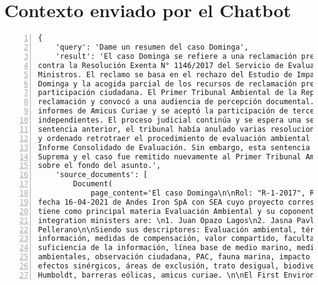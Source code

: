 \chapter{Contexto enviado por el Chatbot}\label{appx:contexto}

\begin{Verbatim}[frame=lines, label=Elavoración propia -  Ejemplo de Contexto enviado por el Chatbot a OpenAI
				, fontsize=\scriptsize, numbers=left
				, baselinestretch=0.4
				, formatcom=\color{gray}]
{
    'query': 'Dame un resumen del caso Dominga',
    'result': 'El caso Dominga se refiere a una reclamación presentada por Andes Iron SpA
contra la Resolución Exenta N° 1146/2017 del Servicio de Evaluación Ambiental y el Comité de
Ministros. El reclamo se basa en el rechazo del Estudio de Impacto Ambiental del proyecto
Dominga y la acogida parcial de los recursos de reclamación presentados en el marco de la
participación ciudadana. El Primer Tribunal Ambiental de la República de Chile admitió la
reclamación y convocó a una audiencia de percepción documental. Además, se presentaron
informes de Amicus Curiae y se aceptó la participación de terceros coadyuvantes e
independientes. El proceso judicial continúa y se espera una sentencia definitiva. En una
sentencia anterior, el tribunal había anulado varias resoluciones relacionadas con el proyecto
y ordenado retrotraer el procedimiento de evaluación ambiental a una etapa posterior al
Informe Consolidado de Evaluación. Sin embargo, esta sentencia fue anulada por la Corte
Suprema y el caso fue remitido nuevamente al Primer Tribunal Ambiental para que se pronuncie
sobre el fondo del asunto.',
    'source_documents': [
        Document(
            page_content='El caso Dominga\n\nRol: "R-1-2017", Rol: "R-1-2017",Rol: "R-1-2017",
fecha 16-04-2021 de Andes Iron SpA con SEA cuyo proyecto corresponde a Dominga. Este caso
tiene como principal materia Evaluación Ambiental y su coponente ambiental es Agua\n\nThe
integration ministers are: \n1. Juan Opazo Lagos\n2. Jasna Pavlich Núñez\n3. Fabrizio Queirolo
Pellerano\n\nSiendo sus descriptores: Evaluación ambiental, término anticipado, suficiencia de
información, medidas de compensación, valor compartido, facultades del Comité de Ministros,
suficiencia de la información, línea base de medio marino, medida voluntaria, riesgos
ambientales, observación ciudadana, PAC, fauna marina, impacto de ruidos, rutas de navegación,
efectos sinérgicos, áreas de exclusión, trato desigual, biodiversidad marina, pingüino
Humboldt, barreras eólicas, amicus curiae. \n\nEl First Environmental Court Acoge la causa en

\end{Verbatim}
